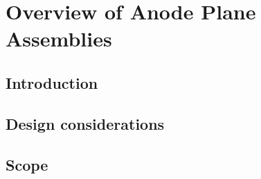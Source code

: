 \chapter{Overview of Anode Plane Assemblies}
\label{ch:fdsp-apa-ov}

\section{Introduction}
\label{sec:fdsp-apa-intro}

\section{Design considerations}
\label{sec:fdsp-apa-des-consid}


\section{Scope}
\label{sec:fdsp-apa-scope}

